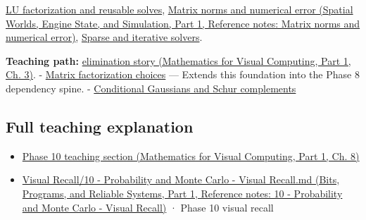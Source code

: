 \hypertarget{appendix-f6e77f4a200f-used-by}{}

\hyperref[appendix-55e4b5b0a1e6]{LU factorization and reusable solves}, \href{../05-Spatial-Worlds-Engine-State-and-Simulation-P01/main.pdf\#nameddest=appendix-f8657bac66e5}{Matrix norms and numerical error (Spatial Worlds, Engine State, and Simulation, Part 1, Reference notes: Matrix norms and numerical error)}, \hyperref[appendix-67c87a3d9e94]{Sparse and iterative solvers}.

\textbf{Teaching path:} \href{../02-Mathematics-for-Visual-Computing-P01/main.pdf\#nameddest=01-foundations-i-ch019-elimination-turns-the-geometry-into-an-auditable-calculation}{elimination story (Mathematics for Visual Computing, Part 1, Ch. 3)}. - \hyperref[appendix-221a483bec2d]{Matrix factorization choices} --- Extends this foundation into the Phase 8 dependency spine. - \hyperref[appendix-f0437ea55a47]{Conditional Gaussians and Schur complements}

\subsection{Full teaching explanation}\label{appendix-f6e77f4a200f-full-teaching-explanation}

\hypertarget{appendix-f6e77f4a200f-full-teaching-explanation}{}

\begin{itemize}
\tightlist
\item
  \href{../02-Mathematics-for-Visual-Computing-P01/main.pdf\#nameddest=02-foundations-ii-ch024-waiting-times-event-counts-and-covariance-geometry}{Phase 10 teaching section (Mathematics for Visual Computing, Part 1, Ch. 8)}
\item
  \href{../01-Bits-Programs-and-Reliable-Systems-P01/main.pdf\#nameddest=appendix-cb5af353ef77}{Visual Recall/10 - Probability and Monte Carlo - Visual Recall.md (Bits, Programs, and Reliable Systems, Part 1, Reference notes: 10 - Probability and Monte Carlo - Visual Recall)} · Phase 10 visual recall
\end{itemize}

